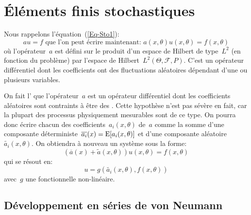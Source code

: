 \medskip
\section{Éléments finis stochastiques}

Nous rappelons l'équation~(\ref{Eq-Sto1}):
$$ au=f \text{ que l'on peut écrire maintenant: } a(x,\theta) u(x,\theta) = f(x,\theta)$$
où l'opérateur~$a$ est défini sur le produit d'un espace de Hilbert de type~$L^2$ (en fonction du problème) par l'espace de Hilbert~$L^2(\Theta,\mathcal{F},P)$.
C'est un opérateur différentiel dont les coefficients ont des fluctuations aléatoires dépendant d'une ou plusieurs variables.

\medskip
On fait l' que l'opérateur~$a$ est un opérateur différentiel dont les coefficients aléatoires sont contraints à être des .
Cette hypothèse n'est pas sévère en fait, car la plupart des processus physiquement mesurables sont de ce type.
On pourra donc écrire chacun des coefficients~$a_i(x,\theta)$ de~$a$ comme la somme d'une composante déterministe~$\overline{a_i}(x)=\operatorname{E}[a_i(x,\theta)]$ et d'une composante aléatoire~$\widetilde{a_i}(x,\theta)$.
On obtiendra à nouveau un système sous la forme:
\begin{equation}\label{Eq-Sto2}
(\overline{a}(x)+\widetilde{a}(x,\theta))u(x,\theta)=f(x,\theta)
\end{equation}
qui se résout en:
\begin{equation}
u=g(\widetilde{a_i}(x,\theta),f(x,\theta))
\end{equation}
avec~$g$ une fonctionnelle non-linéaire.

\medskip
\subsection{Développement en séries de von Neumann}

